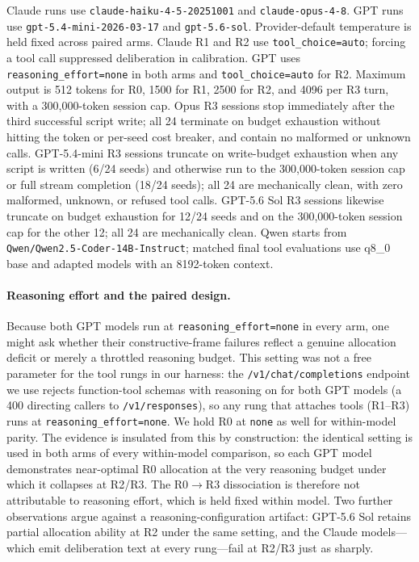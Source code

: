 \documentclass{article}
\begin{document}
Claude runs use \texttt{claude-haiku-4-5-20251001} and \texttt{claude-opus-4-8}. GPT runs use \texttt{gpt-5.4-mini-2026-03-17} and \texttt{gpt-5.6-sol}. Provider-default temperature is held fixed across paired arms. Claude R1 and R2 use \texttt{tool\_choice=auto}; forcing a tool call suppressed deliberation in calibration. GPT uses \texttt{reasoning\_effort=none} in both arms and \texttt{tool\_choice=auto} for R2. Maximum output is 512 tokens for R0, 1500 for R1, 2500 for R2, and 4096 per R3 turn, with a 300,000-token session cap. Opus R3 sessions stop immediately after the third successful script write; all 24 terminate on budget exhaustion without hitting the token or per-seed cost breaker, and contain no malformed or unknown calls. GPT-5.4-mini R3 sessions truncate on write-budget exhaustion when any script is written (6/24 seeds) and otherwise run to the 300,000-token session cap or full stream completion (18/24 seeds); all 24 are mechanically clean, with zero malformed, unknown, or refused tool calls. GPT-5.6 Sol R3 sessions likewise truncate on budget exhaustion for 12/24 seeds and on the 300,000-token session cap for the other 12; all 24 are mechanically clean. Qwen starts from \texttt{Qwen/Qwen2.5-Coder-14B-Instruct}; matched final tool evaluations use q8\_0 base and adapted models with an 8192-token context.

\paragraph{Reasoning effort and the paired design.} Because both GPT models run at \texttt{reasoning\_effort=none} in every arm, one might ask whether their constructive-frame failures reflect a genuine allocation deficit or merely a throttled reasoning budget. This setting was not a free parameter for the tool rungs in our harness: the \texttt{/v1/chat/completions} endpoint we use rejects function-tool schemas with reasoning on for both GPT models (a 400 directing callers to \texttt{/v1/responses}), so any rung that attaches tools (R1--R3) runs at \texttt{reasoning\_effort=none}. We hold R0 at \texttt{none} as well for within-model parity. The evidence is insulated from this by construction: the identical setting is used in both arms of every within-model comparison, so each GPT model demonstrates near-optimal R0 allocation at the very reasoning budget under which it collapses at R2/R3. The R0$\to$R3 dissociation is therefore not attributable to reasoning effort, which is held fixed within model. Two further observations argue against a reasoning-configuration artifact: GPT-5.6 Sol retains partial allocation ability at R2 under the same setting, and the Claude models---which emit deliberation text at every rung---fail at R2/R3 just as sharply.
\end{document}
